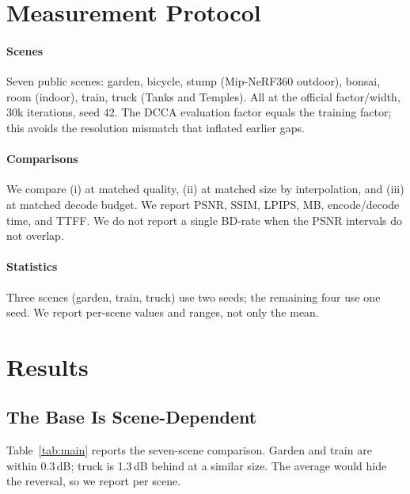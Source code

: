 \documentclass[conference]{IEEEtran}
\begin{document}
\section{Measurement Protocol}
\label{sec:protocol}
\paragraph{Scenes}
Seven public scenes: garden, bicycle, stump (Mip-NeRF360 outdoor), bonsai, room (indoor), train, truck (Tanks and Temples). All at the official factor/width, 30k iterations, seed 42. The DCCA evaluation factor equals the training factor; this avoids the resolution mismatch that inflated earlier gaps.

\paragraph{Comparisons}
We compare (i) at matched quality, (ii) at matched size by interpolation, and (iii) at matched decode budget. We report PSNR, SSIM, LPIPS, MB, encode/decode time, and TTFF. We do not report a single BD-rate when the PSNR intervals do not overlap.

\paragraph{Statistics}
Three scenes (garden, train, truck) use two seeds; the remaining four use one seed. We report per-scene values and ranges, not only the mean.

\section{Results}
\label{sec:results}

\subsection{The Base Is Scene-Dependent}
Table~\ref{tab:main} reports the seven-scene comparison. Garden and train are within 0.3\,dB; truck is 1.3\,dB behind at a similar size. The average would hide the reversal, so we report per scene.
\end{document}
